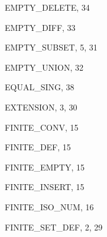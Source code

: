 \begin{theindex}
  \indexspace

  \item {\ptt EMPTY\_DELETE}, 34
  \item {\ptt EMPTY\_DIFF}, 33
  \item {\ptt EMPTY\_SUBSET}, 5, 31
  \item {\ptt EMPTY\_UNION}, 32
  \item {\ptt EQUAL\_SING}, 38
  \item {\ptt EXTENSION}, 3, 30

  \indexspace

  \item {\ptt FINITE\_CONV}, 15
  \item {\ptt FINITE\_DEF}, 15
  \item {\ptt FINITE\_EMPTY}, 15
  \item {\ptt FINITE\_INSERT}, 15
  \item {\ptt FINITE\_ISO\_NUM}, 16
  \item {\ptt FINITE\_SET\_DEF}, 2, 29

  \indexspace


\end{theindex}

